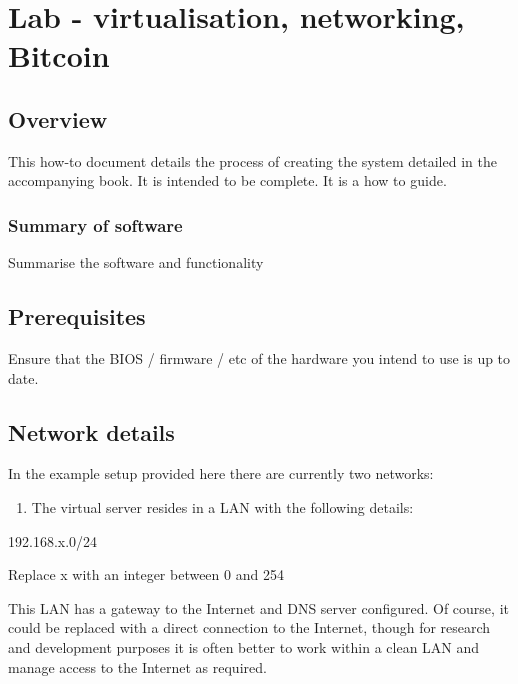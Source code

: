 \hypertarget{lab---virtualisation-networking-bitcoin}{%
\section{Lab - virtualisation, networking,
Bitcoin}\label{lab---virtualisation-networking-bitcoin}}

\hypertarget{overview}{%
\subsection{Overview}\label{overview}}

This how-to document details the process of creating the system detailed
in the accompanying book. It is intended to be complete. It is a how to
guide.

\hypertarget{summary-of-software}{%
\subsubsection{Summary of software}\label{summary-of-software}}

Summarise the software and functionality

\hypertarget{prerequisites}{%
\subsection{Prerequisites}\label{prerequisites}}

Ensure that the BIOS / firmware / etc of the hardware you intend to use
is up to date.

\hypertarget{network-details}{%
\subsection{Network details}\label{network-details}}

In the example setup provided here there are currently two networks:

\begin{enumerate}
\def\labelenumi{\arabic{enumi}.}

\item
  The virtual server resides in a LAN with the following details:
\end{enumerate}

192.168.x.0/24

Replace x with an integer between 0 and 254

This LAN has a gateway to the Internet and DNS server configured. Of
course, it could be replaced with a direct connection to the Internet,
though for research and development purposes it is often better to work
within a clean LAN and manage access to the Internet as required.

